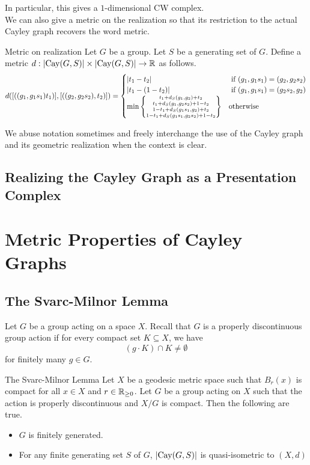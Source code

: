 \documentclass[a4paper]{article}
\begin{document}
In particular, this gives a $1$-dimensional CW complex. \\

We can also give a metric on the realization so that its restriction to the actual Cayley graph recovers the word metric. 

\begin{defn}{Metric on realization}{} Let $G$ be a group. Let $S$ be a generating set of $G$. Define a metric $d:\abs{\text{Cay}(G,S)}\times\abs{\text{Cay}(G,S)}\to\mathbb{R}$ as follows. $$d([((g_1,g_1s_1)t_1)],[((g_2,g_2s_2),t_2)])=\begin{cases}
\abs{t_1-t_2} & \text{ if } (g_1,g_1s_1)=(g_2,g_2s_2)\\
\abs{t_1-(1-t_2)} & \text{ if }(g_1,g_1s_1)=(g_2s_2,g_2)\\
\min\left\{\substack{t_1+d_S(g_1,g_2)+t_2\\t_1+d_S(g_1,g_2s_2)+1-t_2\\1-t_1+d_S(g_1s_1,g_2)+t_2\\1-t_1+d_S(g_1s_1,g_2s_2)+1-t_2}\right\} & \text{otherwise}
\end{cases}$$
\end{defn}

We abuse notation sometimes and freely interchange the use of the Cayley graph and its geometric realization when the context is clear. 

\subsection{Realizing the Cayley Graph as a Presentation Complex}

\pagebreak
\section{Metric Properties of Cayley Graphs}
\subsection{The Svarc-Milnor Lemma}
Let $G$ be a group acting on a space $X$. Recall that $G$ is a properly discontinuous group action if for every compact set $K\subseteq X$, we have $$(g\cdot K)\cap K\neq\emptyset$$ for finitely many $g\in G$. 

\begin{thm}{The Svarc-Milnor Lemma}{} Let $X$ be a geodesic metric space such that $B_r(x)$ is compact for all $x\in X$ and $r\in\mathbb{R}_{\geq 0}$. Let $G$ be a group acting on $X$ such that the action is properly discontinuous and $X/G$ is compact. Then the following are true. 
\begin{itemize}
\item $G$ is finitely generated. 
\item For any finite generating set $S$ of $G$, $\abs{\text{Cay}(G,S)}$ is quasi-isometric to $(X,d)$
\end{itemize}
\end{thm}
\end{document}
